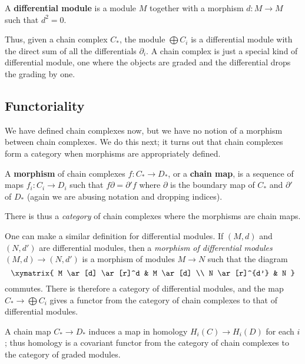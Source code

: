 \begin{definition} 
A \textbf{differential module} is a module $M$ together with a morphism $d:
M\to M$ such that $d^2 =0$.
\end{definition} 

Thus, given a chain complex $C_*$, the module $\bigoplus C_i$ is a
differential module with the direct sum of all the differentials $\partial_i$.
A chain complex is just a special kind of differential module, one where the
objects are graded and the differential drops the grading by one.

\subsection{Functoriality}
We have defined chain complexes now, but we have no notion of a morphism
between chain complexes.
We do this next; it turns out that chain complexes form a category when morphisms
are appropriately defined.

\begin{definition} A \textbf{morphism} of chain complexes $f:C_*\rightarrow
D_*$, or a \textbf{chain map}, is a sequence of maps $f_i:C_i\rightarrow
D_i$ such that $f\partial = \partial' f$ where $\partial$ is the
boundary map of $C_*$ and $\partial'$ of $D_*$ (again we are
abusing notation and dropping indices). 
\end{definition}

There is thus a \emph{category} of chain complexes where the morphisms are
chain maps.

One can make a similar definition for differential modules. If $(M, d)$ and
$(N,d')$ are differential modules, then a \emph{morphism of differential
modules} $(M,d) \to (N,d')$ is a morphism of modules $M \to N$ such that the diagram 
\[ 
\xymatrix{
M \ar[d] \ar[r]^d &  M \ar[d] \\
N \ar[r]^{d'} &  N
}
\]
commutes. 
There is therefore a category of differential modules, and the map $C_* \to
\bigoplus C_i$ gives a functor from the category of chain complexes to that of
differential modules.


\begin{proposition} A chain map $C_* \to D_*$ induces a map in homology $H_i(C)
\to H_i(D)$ for each $i$; thus homology is a covariant functor from
the category of chain complexes to the category of graded
modules.
\end{proposition}

